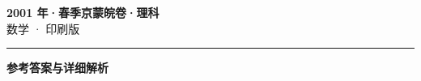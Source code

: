 \documentclass[zihao=5, a4paper]{ctexart}
\begin{document}
\begin{center}
  {\Large\bfseries 2001 年·春季京蒙皖卷·理科}\\[4pt]
  {\large 数学 · 印刷版}
\end{center}
\medskip
{}

\par\bigskip\hrule\bigskip
{}
\begin{center}{\large\bfseries 参考答案与详细解析}\end{center}
\smallskip

\end{document}
